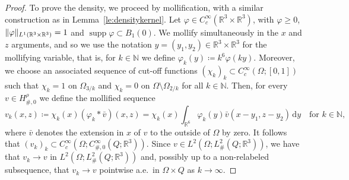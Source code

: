 \documentclass[reqno,11pt]{amsart}
\numberwithin{equation}{section}
\theoremstyle{thmlemcorr}
\numberwithin{theorem}{section}
\theoremstyle{thmlemcorr*}
\theoremstyle{defi}
\theoremstyle{remexample}
\theoremstyle{ass}
\newcommand{\N}{\mathbb{N}}
\newcommand{\R}{\mathbb{R}}
\DeclarePairedDelimiter{\norm}{\lVert}{\rVert}
\newcommand{\1}{\mathds{1}}
\DeclareMathOperator{\supp}{supp}
\newcommand{\Om}{\Omega}
\newcommand{\dl}{\,\mathrm{d}}
\newcommand{\seq}[1]{(#1_k)_{k}}
\begin{document}
\begin{proof}
    
    To prove the density, we proceed by mollification, with a similar construction as in Lemma~\ref{le:densitykernel}.
    Let \(\varphi\in C_c^\infty(\R^3\times \R^3)\), with $\varphi \geq 0$, \(\norm{\varphi}_{L^1(\R^3\times \R^3)}=1\) and \(\supp \varphi\subset B_1(0)\). We mollify simultaneously in the \(x\) and \(z\) arguments, and so we use the notation \(y=(y_1,y_2)\in \R^3\times\R^3\) for the mollifying variable, that is, for $k \in \N$ we define \(\varphi_k(y)\coloneqq k^{6}\varphi(ky)\). Moreover, we choose an associated sequence of cut-off functions \(\seq{\chi}\subset C_c^\infty(\Om;[0,1])\) such that \(\chi_k= 1\) on \(\Om_{3/k}\) and \(\chi_k=0\) on \(\Om\setminus \Om_{2/k}\) for all $k \in \N$. Then, for every \(v\in H^\rho_{\#,0}\) we define the mollified sequence 
    \begin{equation*}
        v_k(x,z)
        \coloneqq \chi_k(x)(\varphi_k*\bar{v})(x,z)
        = \chi_k(x)\int_{\R^6}\varphi_{k}(y)\bar{v}(x-y_1,z-y_2)\dl y \quad \text{for $k \in \N$},
    \end{equation*}
    where \(\bar{v}\) denotes the extension in \(x\) of \(v\) to the outside of \(\Om\) by zero. It follows that \(\seq{v}\subset C_c^\infty(\Om;C_{\#,0}^\infty( Q;\R^3))\). Since \(v\in L^2(\Om;L^2_\#(Q;\R^3))\), we have that \(v_k\to v\) in \(L^2(\Om;L^2_\#(Q;\R^3))\) and, possibly up to a non-relabeled subsequence, that \(v_k\to v\) pointwise a.e.~in \(\Om\times Q\) as $k \to \infty.$ 


\end{proof}
\end{document}
